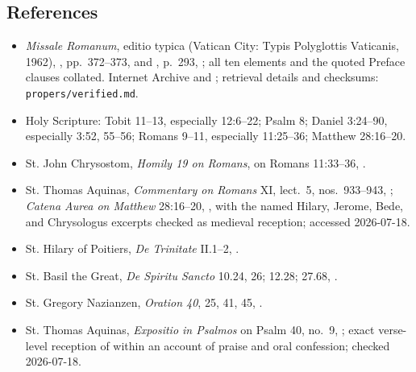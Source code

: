 \begin{deepstudy}
\section*{References}
{\small
\begin{itemize}
\item \emph{Missale Romanum}, editio typica (Vatican City: Typis Polyglottis Vaticanis, 1962), , pp.~372--373, and , p.~293, ; all ten elements and the quoted Preface clauses collated. Internet Archive  and ; retrieval details and checksums: \nolinkurl{propers/verified.md}.
\item Holy Scripture: Tobit 11--13, especially 12:6--22; Psalm 8; Daniel 3:24--90, especially 3:52, 55--56; Romans 9--11, especially 11:25--36; Matthew 28:16--20.
\item St. John Chrysostom, \emph{Homily 19 on Romans}, on Romans 11:33--36, .
\item St. Thomas Aquinas, \emph{Commentary on Romans} XI, lect.~5, nos.~933--943, ; \emph{Catena Aurea on Matthew} 28:16--20, , with the named Hilary, Jerome, Bede, and Chrysologus excerpts checked as medieval reception; accessed 2026-07-18.
\item St. Hilary of Poitiers, \emph{De Trinitate} II.1--2, .
\item St. Basil the Great, \emph{De Spiritu Sancto} 10.24, 26; 12.28; 27.68, .
\item St. Gregory Nazianzen, \emph{Oration 40}, 25, 41, 45, .
\item St. Thomas Aquinas, \emph{Expositio in Psalmos} on Psalm 40, no.~9, ; exact verse-level reception of  within an account of praise and oral confession; checked 2026-07-18.

\end{itemize}}
\end{deepstudy}
